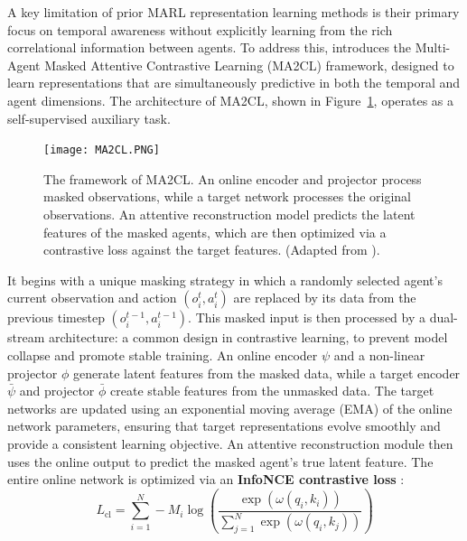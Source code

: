A key limitation of prior MARL representation learning methods is their primary focus on temporal awareness without explicitly learning from the rich correlational information between agents. To address this, \parencite{ma2cl} introduces the Multi-Agent Masked Attentive Contrastive Learning (MA2CL) framework, designed to learn representations that are simultaneously predictive in both the temporal and agent dimensions. The architecture of MA2CL, shown in Figure~\ref{fig:ma2cl_architecture}, operates as a self-supervised auxiliary task.


\begin{figure}[H] 
    \centering
        \texttt{[image: MA2CL.PNG]}
   
    
        \caption{The framework of MA2CL. An online encoder and projector process masked observations, while a target network processes the original observations. An attentive reconstruction model predicts the latent features of the masked agents, which are then optimized via a contrastive loss against the target features. (Adapted from \parencite{ma2cl}).}
        \label{fig:ma2cl_architecture}
\end{figure}


It begins with a unique masking strategy in which a randomly selected agent’s current observation and action \((o^t_i, a^t_i)\) are replaced by its data from the previous timestep \((o^{t-1}_i, a^{t-1}_i)\). This masked input is then processed by a dual-stream architecture: a common design in contrastive learning, to prevent model collapse and promote stable training. An online encoder \(\psi\) and a non-linear projector \(\phi\) generate latent features from the masked data, while a target encoder \(\bar{\psi}\) and projector \(\bar{\phi}\) create stable features from the unmasked data. The target networks are updated using an exponential moving average (EMA) of the online network parameters, ensuring that target representations evolve smoothly and provide a consistent learning objective. 
An attentive reconstruction module then uses the online output to predict the masked agent’s true latent feature. The entire online network is optimized via an \textbf{InfoNCE contrastive loss} :
\begin{equation}
    \label{eq:ma2cl_loss}
    L_{\text{cl}} = \sum_{i=1}^{N} -M_i \log \left( \frac{\exp(\omega(q_i, k_i))}{\sum_{j=1}^{N} \exp(\omega(q_i, k_j))} \right)
\end{equation}


